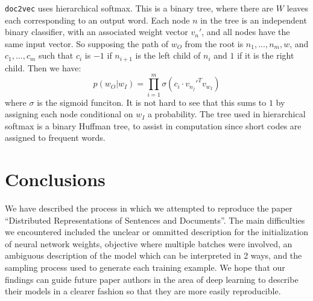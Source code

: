 \documentclass{article}
\begin{document}
\texttt{doc2vec} uses hierarchical softmax. This is a binary tree, where there are $W$ leaves each corresponding to an output word. Each node $n$ in the tree is an independent binary classifier, with an associated weight vector $v_n'$, and all nodes have the same input vector. So supposing the path of $w_O$ from the root is $n_1,...,n_m,w$, and $c_1,...,c_m$ such that $c_i$ is $-1$ if $n_{i+1}$ is the left child of ${n_i}$ and $1$ if it is the right child. Then we have:
    \[p(w_O|w_I)=\prod_{i=1}^{m}\sigma(c_i\cdot v_{n_j}'^T v_{w_I})\]
where $\sigma$ is the sigmoid funciton. It is not hard to see that this sums to $1$ by assigning each node conditional on $w_I$ a probability. The tree used in hierarchical softmax is a binary Huffman tree, to assist in computation since short codes are assigned to frequent words.

\section{Conclusions}
We have described the process in which we attempted to reproduce the paper ``Distributed Representations of Sentences and Documents''. The main difficulties we encountered included the unclear or ommitted description for the initialization of neural network weights, objective where multiple batches were involved, an ambiguous description of the model which can be interpreted in 2 ways, and the sampling process used to generate each training example. We hope that our findings can guide future paper authors in the area of deep learning to describe their models in a clearer fashion so that they are more easily reproducible.

{}

\end{document}
